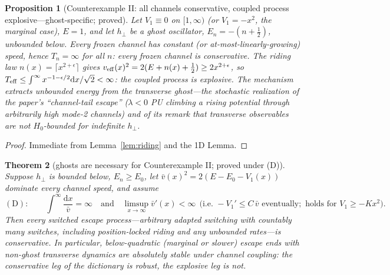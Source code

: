 \documentclass[11pt]{article}
\newtheorem{theorem}{Theorem}
\newtheorem{proposition}[theorem]{Proposition}
\theoremstyle{remark}
\newcommand{\dd}{\mathrm{d}}
\begin{document}
\begin{proposition}[Counterexample II: all channels conservative,
coupled process explosive---ghost-specific; proved]\label{prop:ce2}
Let $V_{1}\equiv0$ on $[1,\infty)$ (or $V_{1}=-x^{2}$, the marginal
case), $E=1$, and let $h_{\perp}$ be a \emph{ghost} oscillator,
$E_{n}=-(n+\tfrac12)$, unbounded below.  Every frozen channel has
constant (or at-most-linearly-growing) speed, hence
$T_{n}=\infty$ for all $n$: every frozen channel is conservative.  The
riding law $n(x)=\lceil x^{2+\epsilon}\rceil$ gives
$v_{\rm eff}(x)^{2}=2(E+n(x)+\tfrac12)\ge2x^{2+\epsilon}$, so
$T_{\rm eff}\le\int^{\infty}x^{-1-\epsilon/2}\dd x/\sqrt2<\infty$:
the coupled process is \emph{explosive}.  The mechanism extracts
unbounded energy from the transverse ghost---the stochastic realization
of the paper's ``channel-tail escape'' ($\lambda<0$ PU climbing a
rising potential through arbitrarily high mode-2 channels) and of its
remark that transverse observables are not $H_{0}$-bounded for
indefinite $h_{\perp}$.
\end{proposition}

\begin{proof}
Immediate from Lemma~\ref{lem:riding} and the 1D Lemma.
\end{proof}

\begin{theorem}[ghosts are necessary for Counterexample II; proved
under (D)]\label{thm:F}
Suppose $h_{\perp}$ is bounded below, $E_{n}\ge E_{0}$, let
$\bar v(x)^{2}=2(E-E_{0}-V_{1}(x))$ dominate every channel speed, and
assume
\[
(\mathrm D):\qquad \int^{\infty}\frac{\dd x}{\bar v}=\infty
\quad\text{and}\quad
\limsup_{x\to\infty}\bar v'(x)<\infty
\ \ \bigl(\text{i.e.\ }-V_{1}'\le C\,\bar v \text{ eventually};
\text{ holds for }V_{1}\ge-Kx^{2}\bigr).
\]
Then \emph{every} switched escape process---arbitrary adapted switching
with countably many switches, including position-locked riding and any
unbounded rates---is conservative.  In particular, below-quadratic
(marginal or slower) escape ends with non-ghost transverse dynamics are
\emph{absolutely} stable under channel coupling: the conservative leg
of the dictionary is robust, the explosive leg is not.
\end{theorem}
\end{document}
